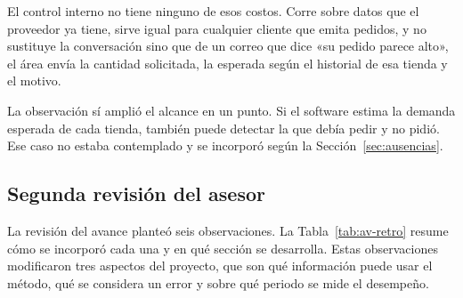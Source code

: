 El control interno no tiene ninguno de esos costos. Corre sobre datos que el proveedor ya tiene, sirve igual para cualquier cliente que emita pedidos, y no sustituye la conversación sino que  de un correo que dice «su pedido parece alto», el área envía la cantidad solicitada, la esperada según el historial de esa tienda y el motivo. 

La observación sí amplió el alcance en un punto. Si el software estima la demanda esperada de cada tienda, también puede detectar la  que debía pedir y no pidió. Ese caso no estaba contemplado y se incorporó según la Sección~\ref{sec:ausencias}.

\iffinal
\subsection{Segunda revisión del asesor}

La revisión del avance planteó seis observaciones. La Tabla~\ref{tab:av-retro} resume cómo se incorporó cada una y en qué sección se desarrolla. Estas observaciones modificaron tres aspectos del proyecto, que son qué información puede usar el método, qué se considera un error y sobre qué periodo se mide el desempeño.

